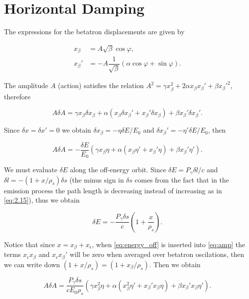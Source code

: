 \documentclass[../sands-adaptation.tex]{subfiles}
\begin{document}
\section{Horizontal Damping}\label{sec:hor_damping}

The expressions for the betatron displacements are given by

\begin{align}
x_\beta &= A\sqrt{\beta} \cos\varphi, \\
x_\beta'& = - A\dfrac{1}{\sqrt{\beta}} \left(\alpha\cos\varphi + \sin\varphi\right).
\end{align}

The amplitude $A$ (action) satisfies the relation $A^2 = \gamma x_\beta^2 + 2\alpha x_\beta x_\beta' + \beta x_\beta'^2$, therefore

\[
A\delta A = \gamma x_\beta \delta x_\beta + \alpha \left(x_\beta \delta x_\beta' + x_\beta' \delta x_\beta\right)  + \beta x_\beta'\delta x_\beta'.
\]

Since $\delta x = \delta x' = 0$ we obtain $\delta x_\beta = - \eta \delta E / E_0$ and $\delta x_\beta' = - \eta' \delta E / E_0$, then

\begin{equation}
A\delta A = -\dfrac{\delta E}{E_0} \left(\gamma x_\beta \eta + \alpha \left(x_\beta \eta' + x_\beta' \eta\right)  + \beta x_\beta'\eta'\right).
\label{eq:amp}
\end{equation}

We must evaluate $\delta E$ along the off-energy orbit. Since $\delta E = P_\gamma \delta l / c$ and $\delta l = -(1 + x / \rho_s) \delta s$
(the minus sign in $\delta s$ comes from the fact that in the emission process the path length is decreasing instead of increasing as in \eqref{eq:2.15}), thus we obtain

\begin{equation}
\delta E = -\dfrac{P_\gamma \delta s}{c} \left(1 + \dfrac{x}{\rho_s}\right).
\label{eq:energy_off}
\end{equation}

Notice that since $x = x_\beta + x_\epsilon$, when \eqref{eq:energy_off} is inserted into \eqref{eq:amp} the terms $x_\epsilon x_\beta$ and $x_\epsilon x_\beta'$
will be zero when averaged over betatron oscilations, then we can write down $(1 + x/\rho_s) = (1 + x_\beta / \rho_s)$. Then we obtain

\[
A\delta A = \dfrac{P_\gamma \delta s}{c E_0 \rho_s} \left(\gamma x_\beta^2 \eta + \alpha \left(x_\beta^2 \eta' + x_\beta' x_\beta  \eta\right)  + \beta x_\beta' x_\beta \eta'\right).
\]
\end{document}

